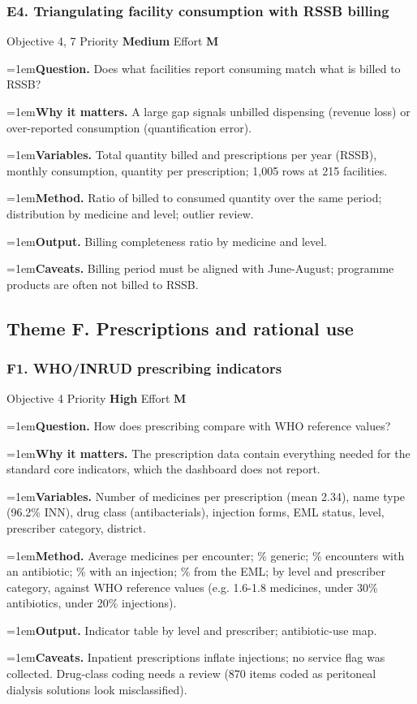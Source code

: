 \documentclass[10pt,a4paper]{article}
\newcommand{\field}[2]{\par\hangindent=1em\textbf{#1.} #2}
\begin{document}
\subsubsection*{E4. Triangulating facility consumption with RSSB billing}
{\footnotesize\color{gray} Objective 4, 7 \textperiodcentered{} Priority \textbf{Medium} \textperiodcentered{} Effort \textbf{M}}
\field{Question}{Does what facilities report consuming match what is billed to RSSB?}
\field{Why it matters}{A large gap signals unbilled dispensing (revenue loss) or over-reported consumption (quantification error).}
\field{Variables}{Total quantity billed and prescriptions per year (RSSB), monthly consumption, quantity per prescription; 1,005 rows at 215 facilities.}
\field{Method}{Ratio of billed to consumed quantity over the same period; distribution by medicine and level; outlier review.}
\field{Output}{Billing completeness ratio by medicine and level.}
\field{Caveats}{Billing period must be aligned with June-August; programme products are often not billed to RSSB.}
\subsection{Theme F. Prescriptions and rational use}
\subsubsection*{F1. WHO/INRUD prescribing indicators}
{\footnotesize\color{gray} Objective 4 \textperiodcentered{} Priority \textbf{High} \textperiodcentered{} Effort \textbf{M}}
\field{Question}{How does prescribing compare with WHO reference values?}
\field{Why it matters}{The prescription data contain everything needed for the standard core indicators, which the dashboard does not report.}
\field{Variables}{Number of medicines per prescription (mean 2.34), name type (96.2\% INN), drug class (antibacterials), injection forms, EML status, level, prescriber category, district.}
\field{Method}{Average medicines per encounter; \% generic; \% encounters with an antibiotic; \% with an injection; \% from the EML; by level and prescriber category, against WHO reference values (e.g. 1.6-1.8 medicines, under 30\% antibiotics, under 20\% injections).}
\field{Output}{Indicator table by level and prescriber; antibiotic-use map.}
\field{Caveats}{Inpatient prescriptions inflate injections; no service flag was collected. Drug-class coding needs a review (870 items coded as peritoneal dialysis solutions look misclassified).}
\end{document}
